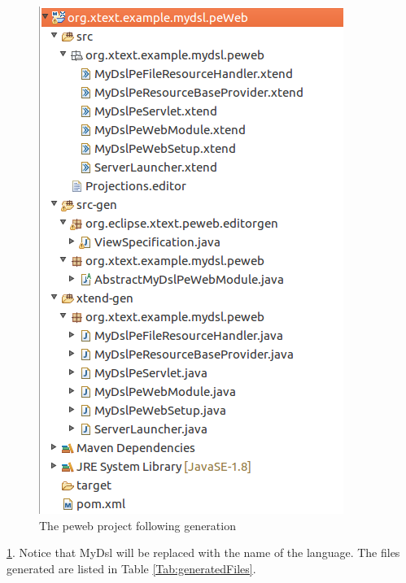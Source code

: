 \documentclass{article}
\begin{document}
\begin{figure}[h!]
  \centering
  \includegraphics[width=0.4\linewidth]{./Screenshots/peWebProjectContentsAfterGeneration.png}
  \caption{The peweb project following generation}
  \label{fig:generatedPeWebProject}
\end{figure} \ref{fig:generatedPeWebProject}. Notice that MyDsl will be replaced with the name of the language.
The files generated are listed in Table \ref{Tab:generatedFiles}.
\end{document}
